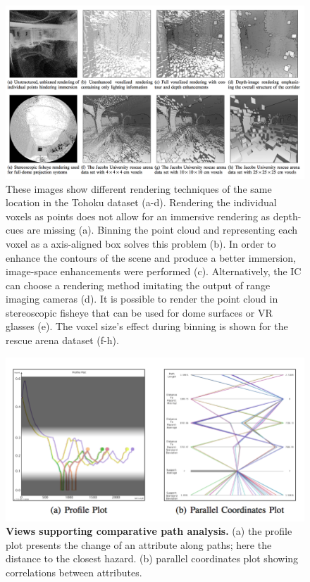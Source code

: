 \documentclass{egpubl}
\begin{document}
\begin{figure}[htb]
  \centering
  \includegraphics[width=.95\linewidth]{star-4-3}
  \caption{\label{fig:star-4-3} These images show different rendering techniques of the same location in the Tohoku dataset (a-d). Rendering the individual voxels as points does not allow for an immersive rendering as depth-cues are missing (a). Binning the point cloud and representing each voxel as a axis-aligned box solves this problem (b). In order to enhance the contours of the scene and produce a better immersion, image-space enhancements were performed (c). Alternatively, the IC can choose a rendering method imitating the output of range imaging cameras (d). It is possible to render the point cloud in stereoscopic fisheye that can be used for dome surfaces or VR glasses (e). The voxel size's effect during binning is shown for the rescue arena dataset (f-h).}
\end{figure}

\begin{figure}[htb]
  \centering
  \includegraphics[width=0.95\linewidth]{star-4-4}
  \caption{\label{fig:star-4-4} \textbf{Views supporting comparative path analysis.} (a) the profile plot presents the change of an attribute along paths; here the distance to the closest hazard. (b) parallel coordinates plot showing correlations between attributes.}
\end{figure}
\end{document}
